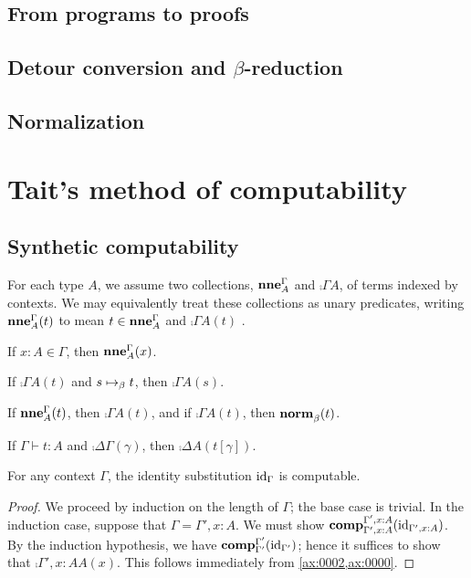 \documentclass[a4paper]{article}
\begin{document}
\subsection{From programs to proofs}
\label{sec:0003}

\subsection{Detour conversion and $\beta$-reduction}
\label{sec:0005}

\subsection{Normalization}
\label{sec:0004}

\section{Tait's method of computability}
\label{sec:0006}

\subsection{Synthetic computability}
\label{sec:0108}

For each type $A$, we assume two collections, $\operatorname{\mathbf{nne}}^{\Gamma}_{A}$ and $\comp{\Gamma}{A}$, of terms indexed by contexts.
We may equivalently treat these collections as unary predicates, writing $\operatorname{\mathbf{nne}}^{\Gamma}_{A}(t)$ to mean $t \in \operatorname{\mathbf{nne}}^{\Gamma}_{A}$ and $\comp{\Gamma}{A}(t)$ \mutatismutandis.

\begin{axiom}\label{ax:0002}
  If $x : A \in \Gamma$, then $\operatorname{\mathbf{nne}}^{\Gamma}_{A}(x)$.
\end{axiom}

\begin{axiom}\label{ax:0003}
  If $\comp{\Gamma}{A}(t)$ and $s \bRed t$, then $\comp{\Gamma}{A}(s)$.
\end{axiom}

\begin{axiom}\label{ax:0000}
  If $\operatorname{\mathbf{nne}}^{\Gamma}_{A}(t)$, then $\comp{\Gamma}{A}(t)$, and if $\comp{\Gamma}{A}(t)$, then $\operatorname{\mathbf{norm}}^{}_{\beta}(t)$.
\end{axiom}

\begin{axiom}\label{ax:0001}
  If $\Gamma \vdash t : A$ and $\comp{\Delta}{\Gamma}(\gamma)$, then $\comp{\Delta}{A}(t[\gamma])$.
\end{axiom}

\begin{lemma}\label{thm:0010}
  For any context $\Gamma$, the identity substitution $\mathrm{id}_{\Gamma}$ is computable.
\end{lemma}
\begin{proof}
  We proceed by induction on the length of $\Gamma$; the base case is trivial.
  In the induction case, suppose that $\Gamma = \Gamma',x : A$.
  We must show $\operatorname{\mathbf{comp}}^{\Gamma',x : A}_{\Gamma',x : A}(\mathrm{id}_{\Gamma',x : A})$.
  By the induction hypothesis, we have $\operatorname{\mathbf{comp}}^{\Gamma'}_{\Gamma'}(\mathrm{id}_{\Gamma'})$; hence it suffices to show that $\comp{\Gamma',x : A}{A}(x)$.
  This follows immediately from \cref{ax:0002,ax:0000}.
\end{proof}
\end{document}

